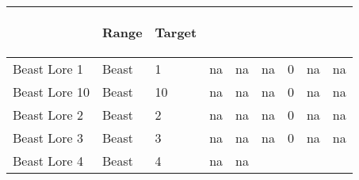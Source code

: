 \documentclass[twoside]{book}
\begin{document}
\begin{longtable}{p{1.25in}lp{2em}p{3em}llp{7em}ll}
  &
  \begin{turn}{70}{Range}\end{turn}
          
  &
  \begin{turn}{70}{Target}\end{turn}
          
  \\
  \endhead
      
  \raggedright
           Beast Lore 1 
  &
   Beast 
  &
   1 
  &
  
           na 
  &
   na
           
  &
   na
           
  &
   0
           
  &
   na
           
  &
   na
           
  \tabularnewline
  \hline
      
  \raggedright
           Beast Lore 10 
  &
   Beast 
  &
   10 
  &
  
           na 
  &
   na
           
  &
   na
           
  &
   0
           
  &
   na
           
  &
   na
           
  \tabularnewline
  \hline
      
  \raggedright
           Beast Lore 2 
  &
   Beast 
  &
   2 
  &
  
           na 
  &
   na
           
  &
   na
           
  &
   0
           
  &
   na
           
  &
   na
           
  \tabularnewline
  \hline
      
  \raggedright
           Beast Lore 3 
  &
   Beast 
  &
   3 
  &
  
           na 
  &
   na
           
  &
   na
           
  &
   0
           
  &
   na
           
  &
   na
           
  \tabularnewline
  \hline
      
  \raggedright
           Beast Lore 4 
  &
   Beast 
  &
   4 
  &
  
           na 
  &
   na
           

\end{longtable}
\end{document}
